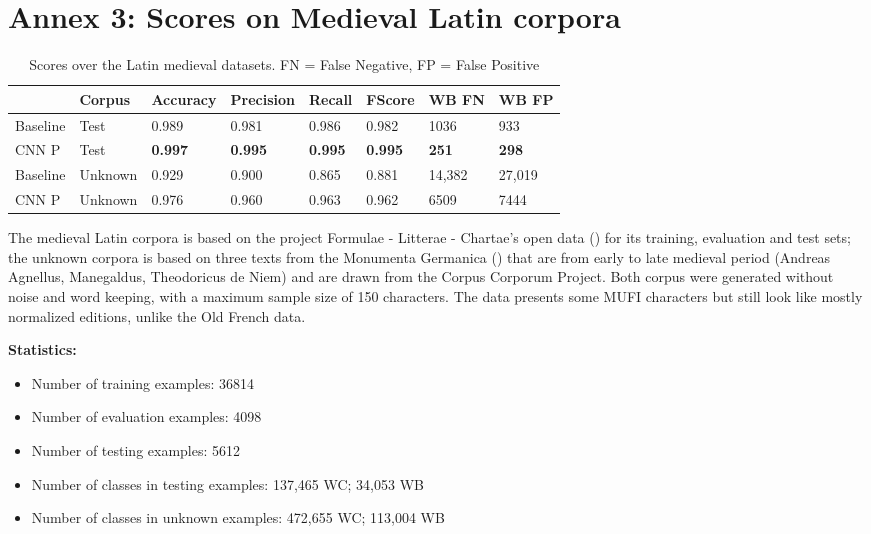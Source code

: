\documentclass{jdmdh}
\begin{document}
\section{Annex 3: Scores on Medieval Latin corpora}

\begin{table}[H]
\centering
\begin{tabular}{llllllll}
\hline
 & Corpus & Accuracy & Precision & Recall & FScore & WB FN & WB FP \\ \hline
Baseline & Test & 0.989 & 0.981 & 0.986 & 0.982 & 1036 & 933 \\
CNN P & Test & \textbf{0.997} & \textbf{0.995} & \textbf{0.995} & \textbf{0.995} & \textbf{251} & \textbf{298} \\ \hline
Baseline & Unknown & 0.929 & 0.900 & 0.865 & 0.881 & 14,382 & 27,019 \\
CNN P & Unknown & 0.976 & 0.960 & 0.963 & 0.962 & 6509 & 7444\\ \hline
\end{tabular}
\caption{Scores over the Latin medieval datasets. FN = False Negative, FP = False Positive}
\label{tab:medieval_latin_corpora}
\end{table}


The medieval Latin corpora is based on the project Formulae - Litterae - Chartae's open data (\citet{formulae}) for its training, evaluation and test sets; the unknown corpora is based on three texts from the Monumenta Germanica (\citet{germanica}) that are from early to late medieval period (Andreas Agnellus, Manegaldus, Theodoricus de Niem) and are drawn from the Corpus Corporum Project. Both corpus were generated without noise and word keeping, with a maximum sample size of 150 characters. The data presents some MUFI characters but still look like mostly normalized editions, unlike the Old French data.

\textbf{Statistics:}

\begin{itemize}
\item Number of training examples: 36814
\item Number of evaluation examples: 4098
\item Number of testing examples: 5612
\item Number of classes in testing examples: 137,465 WC; 34,053 WB
\item Number of classes in unknown examples: 472,655 WC; 113,004 WB
\end{itemize}
\end{document}
